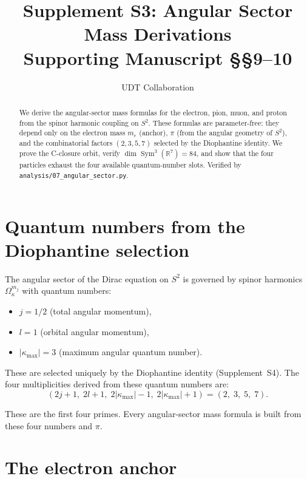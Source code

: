 \documentclass[11pt,letterpaper]{article}
\title{Supplement S3: Angular Sector Mass Derivations \\
\large Supporting Manuscript \S\S9--10}
\author{UDT Collaboration}
\date{}
\numberwithin{equation}{section}
\begin{document}
\maketitle

\begin{abstract}
We derive the angular-sector mass formulas for the electron, pion, muon, and
proton from the spinor harmonic coupling on $S^2$. These formulas are
parameter-free: they depend only on the electron mass $m_e$ (anchor),
$\pi$ (from the angular geometry of $S^2$), and the combinatorial factors
$(2,3,5,7)$ selected by the Diophantine identity. We prove the C-closure
orbit, verify $\dim\operatorname{Sym}^3(\mathbb{R}^7) = 84$, and show that
the four particles exhaust the four available quantum-number slots. Verified
by \texttt{analysis/07\_angular\_sector.py}.
\end{abstract}

\tableofcontents

\section{Quantum numbers from the Diophantine selection}
\label{sec:qn}

The angular sector of the Dirac equation on $S^2$ is governed by spinor
harmonics $\Omega_\kappa^{m_j}$ with quantum numbers:
\begin{itemize}
  \item $j = 1/2$ (total angular momentum),
  \item $l = 1$ (orbital angular momentum),
  \item $|\kappa_\mathrm{max}| = 3$ (maximum angular quantum number).
\end{itemize}

These are selected uniquely by the Diophantine identity (Supplement~S4).
The four multiplicities derived from these quantum numbers are:
\begin{equation}
\label{eq:multiplicities}
  (2j+1,\; 2l+1,\; 2|\kappa_\mathrm{max}|-1,\; 2|\kappa_\mathrm{max}|+1)
  = (2,\; 3,\; 5,\; 7).
\end{equation}

These are the first four primes. Every angular-sector mass formula is built
from these four numbers and $\pi$.

\section{The electron anchor}
\label{sec:electron}
\end{document}
